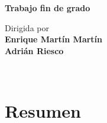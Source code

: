 \documentclass[11pt,a4paper]{article}
\begin{document}
\begin{frontmatter}
\vfill

\begin{center}
  {\Large \textbf{Trabajo fin de grado}}
\end{center}

\vfill

\begin{large}
\begin{center}
{Dirigida por}  \\ [0.3em]
\textbf{Enrique Martín Martín}\\[0.3em]
\textbf{Adrián Riesco}
\begin{large}
\begin{center}
\vspace{3ex}
\end{center}
\end{large}
\end{center}

\vfill

\end{large}

\newpage

\thispagestyle{empty}
\mbox{ }

\clearpage


%


\end{frontmatter}

%




\newpage

{\setlength{\parskip}{0.4cm plus4mm minus3mm}

\newpage
\section*{Resumen\label{sec:res}}

}

\clearpage
\thispagestyle{empty}
\tableofcontents
\end{document}
